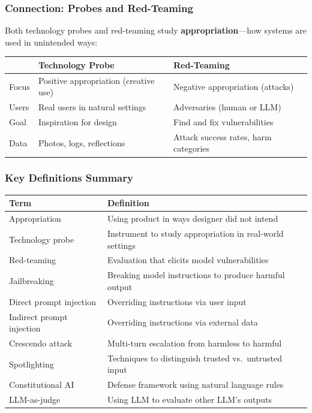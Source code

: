 \subsubsection*{Connection: Probes and Red-Teaming}

Both technology probes and red-teaming study \textbf{appropriation}---how systems are used in unintended ways:

\begin{center}
\renewcommand{\arraystretch}{1.3}
\begin{tabular}{@{} l p{5cm} p{5cm} @{}}
\toprule
& \textbf{Technology Probe} & \textbf{Red-Teaming} \\
\midrule
Focus & Positive appropriation (creative use) & Negative appropriation (attacks) \\
Users & Real users in natural settings & Adversaries (human or LLM) \\
Goal & Inspiration for design & Find and fix vulnerabilities \\
Data & Photos, logs, reflections & Attack success rates, harm categories \\
\bottomrule
\end{tabular}
\end{center}

\subsubsection*{Key Definitions Summary}

\begin{center}
\renewcommand{\arraystretch}{1.3}
\begin{tabular}{@{} l p{8cm} @{}}
\toprule
\textbf{Term} & \textbf{Definition} \\
\midrule
Appropriation & Using product in ways designer did not intend \\
Technology probe & Instrument to study appropriation in real-world settings \\
Red-teaming & Evaluation that elicits model vulnerabilities \\
Jailbreaking & Breaking model instructions to produce harmful output \\
Direct prompt injection & Overriding instructions via user input \\
Indirect prompt injection & Overriding instructions via external data \\
Crescendo attack & Multi-turn escalation from harmless to harmful \\
Spotlighting & Techniques to distinguish trusted vs.\ untrusted input \\
Constitutional AI & Defense framework using natural language rules \\
LLM-as-judge & Using LLM to evaluate other LLM's outputs \\
\bottomrule
\end{tabular}
\end{center}

